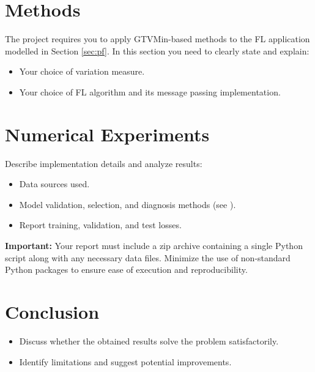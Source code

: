 \documentclass[9pt]{article}
\begin{document}
	\section{Methods}
	\label{sec:methods}
	\begin{tcolorbox}[colback=gray!10, colframe=black!50, title=Instructions (Remove before submission)]
	The project requires you to apply GTVMin-based methods to 
	the FL application modelled in Section \ref{sec:pf}. In this section 
	you need to clearly state and explain:
		\begin{itemize}
			\item Your choice of variation measure.
			\item Your choice of FL algorithm and its message passing implementation.
		\end{itemize}
	\end{tcolorbox}
	
	\section{Numerical Experiments}
	\label{sec:experiments}
	\begin{tcolorbox}[colback=gray!10, colframe=black!50, title=Instructions (Remove before submission)]
		Describe implementation details and analyze results:
		\begin{itemize}
			\item Data sources used.
			\item Model validation, selection, and diagnosis methods (see \cite[Sec.~6.6]{Jung2022}).
			\item Report training, validation, and test losses.
		\end{itemize}
	\end{tcolorbox}
	

\textbf{Important:} Your report must include a zip archive containing a single 
Python script along with any necessary data files. Minimize the use of non-standard 
Python packages to ensure ease of execution and reproducibility.

	
	\section{Conclusion}
	\label{sec:conclusion}
	\begin{tcolorbox}[colback=gray!10, colframe=black!50, title=Instructions (Remove before submission)]
		\begin{itemize}
			\item Discuss whether the obtained results solve the problem satisfactorily.
			\item Identify limitations and suggest potential improvements.
		\end{itemize}
	\end{tcolorbox}
	
\end{document}
